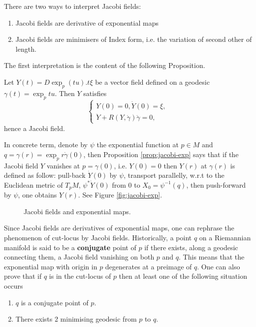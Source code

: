 There are two ways to interpret Jacobi fields:
\begin{enumerate}
\item Jacobi fields are derivative of exponential maps
\item Jacobi fields are minimisers of Index form, i.e. the variation of second other of
length.
\end{enumerate}

The first interpretation is the content of the following Proposition.

\begin{proposition}
\label{prop:jacobi-exp}
Let \(Y(t) = D \exp_p(tu). t\xi\) be a vector field defined on a geodesic \(\gamma(t) =
\exp_p tu\). Then \(Y\) satisfies
\begin{equation}
\label{eq:jacobi-exp}
\begin{cases}
Y(0) = 0, \dot Y(0) = \xi,  \\
\ddot Y + R(Y,\dot \gamma)\dot\gamma = 0,
\end{cases}
\end{equation}
hence a Jacobi field.
\end{proposition}

In concrete term, denote by \(\psi\) the exponential function at \(p\in M\) and \(q=\gamma(r) = \exp_p r\dot\gamma(0)\), then
Proposition \ref{prop:jacobi-exp} says that if the Jacobi field \(Y\) vanishes at
\(p =\gamma(0)\), i.e. \(Y(0) = 0\) then \(Y(r)\) at \(\gamma(r)\) is defined as
follow: pull-back \(\dot Y (0)\) by \(\psi\), transport parallelly, w.r.t to the Euclidean
metric of \(T_pM\), \(\psi^*\dot Y(0)\)
from \(0\) to \(X_0 = \psi^{-1} (q)\), then push-forward by \(\psi\), one obtains \(Y(r)\). See Figure \ref{fig:jacobi-exp}.

\label{fig:jacobi-exp}
\begin{figure}[htbp]
\centering

\caption{Jacobi fields and exponential maps.}
\end{figure} 



Since Jacobi fields are derivatives of exponential maps, one can rephrase the phenomenon
of cut-locus by Jacobi fields. Historically, a point \(q\) on a Riemannian manifold
is said to be a \textbf{conjugate} point of \(p\) if there exists, along a geodesic connecting them, a Jacobi
field vanishing on both \(p\) and \(q\). This means that the exponential map with
origin in \(p\) degenerates at a preimage of \(q\). One can also prove that if \(q\)
is in the cut-locus of \(p\) then at least one of the following situation occurs
\begin{enumerate}
\item \(q\) is a conjugate point of \(p\).
\item There exists 2 minimising geodesic from \(p\) to \(q\).
\end{enumerate}



